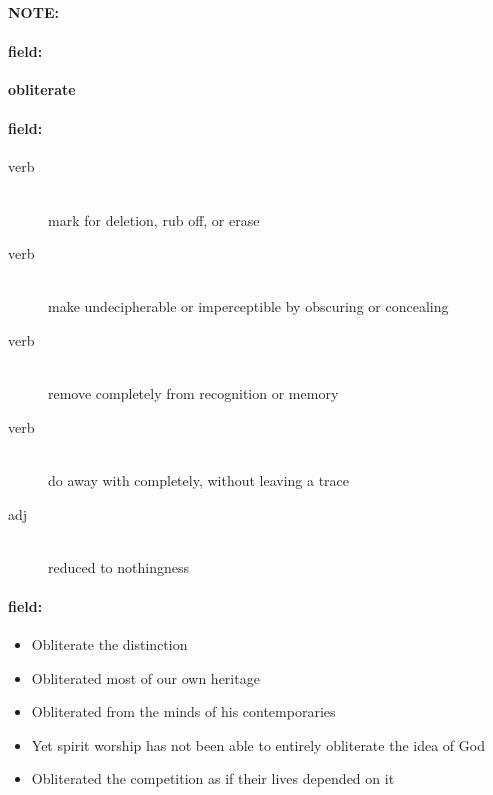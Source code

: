 \documentclass[12pt]{article}
\newenvironment{note}{\paragraph{NOTE:}}{}
\newenvironment{field}{\paragraph{field:}}{}
\begin{document}
\begin{note}
\begin{field}
\textbf{\large obliterate}
\end{field}


\begin{field}
\begin{description}
\item[verb] \hfill \\ 
mark for deletion, rub off, or erase

\item[verb] \hfill \\ 
make undecipherable or imperceptible by obscuring or concealing

\item[verb] \hfill \\ 
remove completely from recognition or memory

\item[verb] \hfill \\ 
do away with completely, without leaving a trace

\item[adj] \hfill \\ 
reduced to nothingness

\end{description}
\end{field}

\begin{field}
\begin{itemize}
\item Obliterate the distinction
\item Obliterated most of our own heritage
\item Obliterated from the minds of his contemporaries
\item Yet spirit worship has not been able to entirely obliterate the idea of God
\item Obliterated the competition as if their lives depended on it
\end{itemize}
\end{field}
\end{note}
\end{document}
